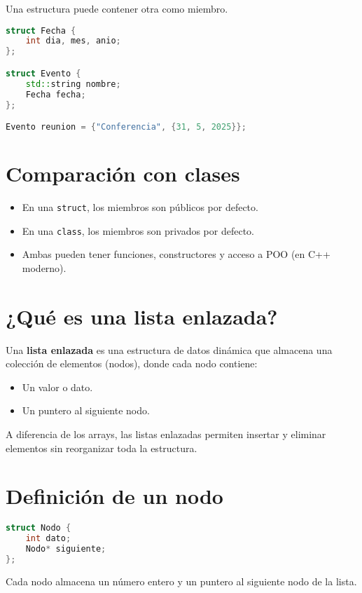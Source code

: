 \documentclass[a4paper]{article}
\begin{document}
Una estructura puede contener otra como miembro.

\begin{lstlisting}[language=C++]
struct Fecha {
    int dia, mes, anio;
};

struct Evento {
    std::string nombre;
    Fecha fecha;
};

Evento reunion = {"Conferencia", {31, 5, 2025}};
\end{lstlisting}

\section{Comparación con clases}

\begin{itemize}
    \item En una \texttt{struct}, los miembros son públicos por defecto.
    \item En una \texttt{class}, los miembros son privados por defecto.
    \item Ambas pueden tener funciones, constructores y acceso a POO (en C++ moderno).
\end{itemize}
\newpage
\section{¿Qué es una lista enlazada?}

Una \textbf{lista enlazada} es una estructura de datos dinámica que almacena una colección de elementos (nodos), donde cada nodo contiene:

\begin{itemize}
    \item Un valor o dato.
    \item Un puntero al siguiente nodo.
\end{itemize}

A diferencia de los arrays, las listas enlazadas permiten insertar y eliminar elementos sin reorganizar toda la estructura.

\section{Definición de un nodo}

\begin{lstlisting}[language=C++]
struct Nodo {
    int dato;
    Nodo* siguiente;
};
\end{lstlisting}

Cada nodo almacena un número entero y un puntero al siguiente nodo de la lista.
\end{document}
